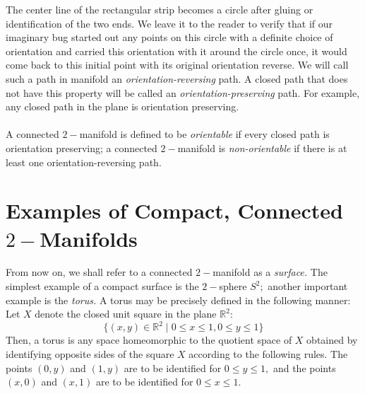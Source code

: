 \documentclass{article}
\theoremstyle{definition}
\begin{document}
The center line of the rectangular strip becomes a circle after gluing or identification of the two ends. We leave it to the reader to verify that if our imaginary bug started out any points on this circle with a definite choice of orientation and carried this orientation with it around the circle once, it would come back to this initial point with its original orientation reverse. We will call such a path in manifold an \emph{orientation-reversing} path. A closed path that does not have this property will be called an \emph{orientation-preserving} path. For example, any closed path in the plane is orientation preserving.\\\\
%
A connected $2-$manifold is defined to be \emph{orientable} if every closed path is orientation preserving; a connected $2-$manifold is \emph{non-orientable} if there is at least one orientation-reversing path.
%
\section{Examples of Compact, Connected \texorpdfstring{$2-$}{2-}Manifolds}
From now on, we shall refer to a connected $2-$manifold as a \emph{surface.} The simplest example of a compact surface is the $2-$sphere $S^2;$ another important example is the \emph{torus.} A torus may be precisely defined in the following manner:\\
Let $X$ denote the closed unit square in the plane $\mathbb{R}^2:$
\[\{(x, y) \in \mathbb{R}^2 \;|\; 0 \le x \le 1, 0 \le y \le 1\}\]
Then, a torus is any space homeomorphic to the quotient space of $X$ obtained by identifying opposite sides of the square $X$ according to the following rules. The points $(0, y)$ and $(1, y)$ are to be identified for $0 \le y \le 1,$ and the points $(x, 0)$ and $(x, 1)$ are to be identified for $0 \le x \le 1.$
\end{document}
